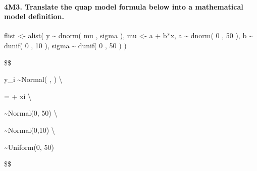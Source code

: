 \documentclass[]{article}
\let\oldparagraph\paragraph
\renewcommand{\paragraph}[1]{\oldparagraph{#1}\mbox{}}
\begin{document}
\hypertarget{m3.-translate-the-quap-model-formula-below-into-a-mathematical-model-definition.}{%
\paragraph{4M3. Translate the quap model formula below into a
mathematical model
definition.}\label{m3.-translate-the-quap-model-formula-below-into-a-mathematical-model-definition.}}

flist \textless- alist( y \textasciitilde{} dnorm( mu , sigma ), mu
\textless- a + b*x, a \textasciitilde{} dnorm( 0 , 50 ), b
\textasciitilde{} dunif( 0 , 10 ), sigma \textasciitilde{} dunif( 0 , 50
) )

\$\$

y\_i \sim Normal( \mu, \sigma ) \textbackslash{}

\mu = \alpha + \beta xi \textbackslash{}

\alpha \sim Normal(0, 50) \textbackslash{}

\beta \sim Normal(0,10) \textbackslash{}

\sigma \sim Uniform(0, 50)

\$\$
\end{document}
